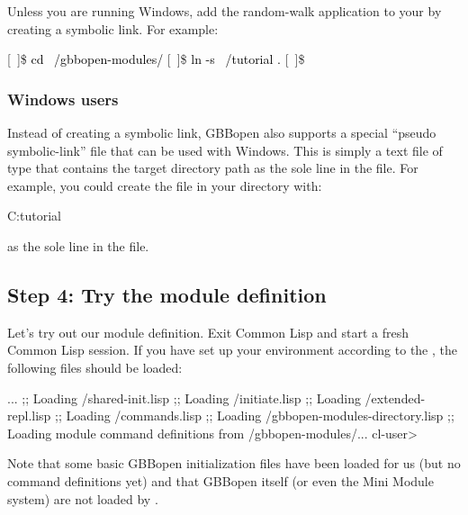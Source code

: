 \documentclass[10pt,twoside,english,pdftex]{article}
\begin{document}
Unless you are running Windows, add the random-walk application to your
 by creating a symbolic link.  For example:
%
\W\supp
\begin{example}
\textcolor{darkergray}{%
  [~]\$ \textcolor{black}{cd ~/gbbopen-modules/}
  [~]\$ \textcolor{black}{ln -s ~/tutorial .}
  [~]\$}
\end{example}

\subsubsection*{Windows users}

Instead of creating a symbolic link, GBBopen also supports a special ``pseudo
symbolic-link'' file that can be used with Windows.  This is simply a text
file of type  that contains the target directory path as the sole
line in the file.  For example, you could create the file 
in your  directory with:
%
\W\supp
\begin{example}
  C:\bkslash{}tutorial\bkslash
\end{example}
\T\vskip -12pt
%
as the sole line in the file.

\subsection*{Step 4: Try the  module definition}

Let's try out our module definition.  Exit Common Lisp and start a fresh
Common Lisp session.  If you have set up your environment according to the
,
the following files should be loaded:
%
\W\supp
\begin{example}
\textcolor{darkergray}{%
     ...
  ;; Loading /shared-init.lisp
  ;;   Loading /initiate.lisp
  ;;     Loading /extended-repl.lisp
  ;;     Loading /commands.lisp
  ;;     Loading /gbbopen-modules-directory.lisp
  ;; Loading module command definitions from /gbbopen-modules/...
  cl-user>}
\end{example}

Note that some basic GBBopen initialization files have been loaded for us (but
no command definitions yet) and that GBBopen itself (or even the Mini Module
system) are not loaded by .
\end{document}
